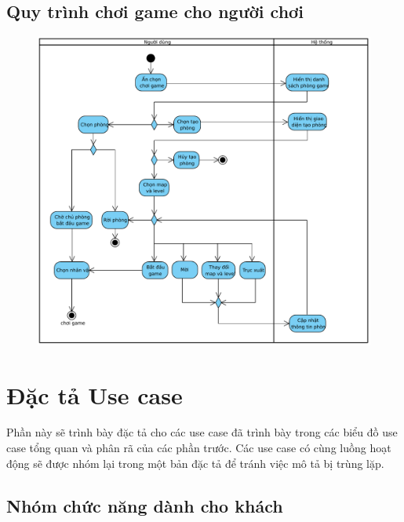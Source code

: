 \documentclass[3p]{elsarticle}
\begin{document}
\subsection{Quy trình chơi game cho người chơi}
\begin{figure}[!htbp]
	\centering
	\includegraphics[scale=.75]{images/Playgame.pdf}
\end{figure}
%
%
%
\newpage
\section{Đặc tả Use case}
Phần này sẽ trình bày đặc tả cho các use case đã trình bày trong các biểu đồ use case tổng quan và phân rã của các phần trước. Các use case có cùng luồng hoạt động sẽ được nhóm lại trong một bản đặc tả để tránh việc mô tả bị trùng lặp.
\subsection{Nhóm chức năng dành cho khách}
\end{document}
